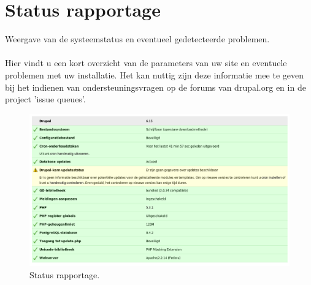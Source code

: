 \section{Status rapportage} 
Weergave van de systeemstatus en eventueel gedetecteerde problemen.\\\\
Hier vindt u een kort overzicht van de parameters van uw site en eventuele
problemen met uw installatie. Het kan nuttig zijn deze informatie mee te geven bij het indienen van ondersteuningsvragen op de forums van drupal.org en in de project 'issue queues'.
 \begin{figure}[!h]
    \centering
   \includegraphics[scale=0.4,angle=0]{status_rapportage}
   \caption{Status rapportage.\label{white}}
 \end{figure}
